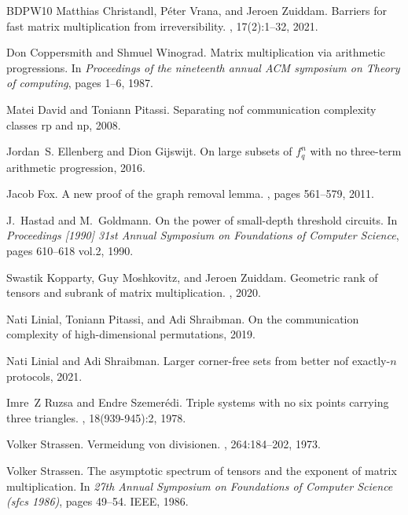 \documentclass[10pt,a4paper]{article}
\begin{document}
\begin{thebibliography}{BDPW10}
Matthias Christandl, P{\'e}ter Vrana, and Jeroen Zuiddam.
\newblock Barriers for fast matrix multiplication from irreversibility.
, 17(2):1--32, 2021.

Don Coppersmith and Shmuel Winograd.
\newblock Matrix multiplication via arithmetic progressions.
\newblock In {\em Proceedings of the nineteenth annual ACM symposium on Theory
  of computing}, pages 1--6, 1987.

Matei David and Toniann Pitassi.
\newblock Separating nof communication complexity classes rp and np, 2008.

Jordan~S. Ellenberg and Dion Gijswijt.
\newblock On large subsets of $f_q^n$ with no three-term arithmetic
  progression, 2016.

Jacob Fox.
\newblock A new proof of the graph removal lemma.
, pages 561--579, 2011.

J.~Hastad and M.~Goldmann.
\newblock On the power of small-depth threshold circuits.
\newblock In {\em Proceedings [1990] 31st Annual Symposium on Foundations of
  Computer Science}, pages 610--618 vol.2, 1990.

Swastik Kopparty, Guy Moshkovitz, and Jeroen Zuiddam.
\newblock Geometric rank of tensors and subrank of matrix multiplication.
, 2020.

Nati Linial, Toniann Pitassi, and Adi Shraibman.
\newblock On the communication complexity of high-dimensional permutations,
  2019.

Nati Linial and Adi Shraibman.
\newblock Larger corner-free sets from better nof exactly-$n$ protocols, 2021.

Imre~Z Ruzsa and Endre Szemer{\'e}di.
\newblock Triple systems with no six points carrying three triangles.
,
  18(939-945):2, 1978.

Volker Strassen.
\newblock Vermeidung von divisionen.
,
  264:184--202, 1973.

Volker Strassen.
\newblock The asymptotic spectrum of tensors and the exponent of matrix
  multiplication.
\newblock In {\em 27th Annual Symposium on Foundations of Computer Science
  (sfcs 1986)}, pages 49--54. IEEE, 1986.


\end{thebibliography}
\end{document}
